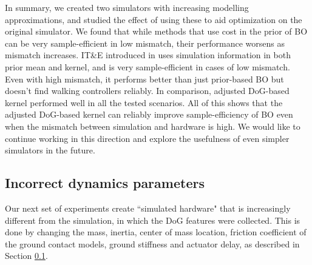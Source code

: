 In summary, we created two simulators with increasing modelling approximations, and studied the effect of using these to aid optimization on the original simulator. We found that while methods that use cost in the prior of BO can be very sample-efficient in low mismatch, their performance worsens as mismatch increases. \mbox{IT\&E} introduced in \cite{cully2015robots} uses simulation information in both prior mean and kernel, and is very sample-efficient in cases of low mismatch. Even with high mismatch, it performs better than just prior-based BO but doesn't find walking controllers reliably. In comparison, adjusted DoG-based kernel performed well in all the tested scenarios. All of this shows that the adjusted DoG-based kernel can reliably improve sample-efficiency of BO even when the mismatch between simulation and hardware is high. We would like to continue working in this direction and explore the usefulness of even simpler simulators in the future.


\subsection{Incorrect dynamics parameters}

Our next set of experiments create ``simulated hardware" that is increasingly different from the simulation, in which the DoG features were collected. This is done by changing the mass, inertia, center of mass location, friction coefficient of the ground contact models, ground stiffness and actuator delay, as described in Section \ref{}.

